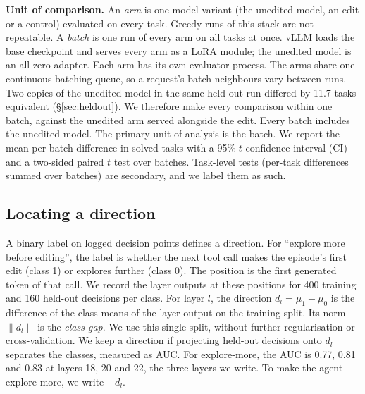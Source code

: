 \textbf{Unit of comparison.} An \emph{arm} is one model variant (the unedited model, an edit or a control) evaluated on every task. Greedy runs of this stack are not repeatable. A \emph{batch} is one run of every arm on all tasks at once. vLLM loads the base checkpoint and serves every arm as a LoRA module; the unedited model is an all-zero adapter. Each arm has its own evaluator process. The arms share one continuous-batching queue, so a request's batch neighbours vary between runs. Two copies of the unedited model in the same held-out run differed by 11.7 tasks-equivalent (\S\ref{sec:heldout}). We therefore make every comparison within one batch, against the unedited arm served alongside the edit. Every batch includes the unedited model. The primary unit of analysis is the batch. We report the mean per-batch difference in solved tasks with a 95\% $t$ confidence interval (CI) and a two-sided paired $t$ test over batches. Task-level tests (per-task differences summed over batches) are secondary, and we label them as such.

\subsection{Locating a direction}
\label{sec:locate}
A binary label on logged decision points defines a direction. For ``explore more before editing'', the label is whether the next tool call makes the episode's first edit (class 1) or explores further (class 0). The position is the first generated token of that call. We record the layer outputs at these positions for 400 training and 160 held-out decisions per class. For layer $l$, the direction $d_l = \mu_1 - \mu_0$ is the difference of the class means of the layer output on the training split. Its norm $\lVert d_l \rVert$ is the \emph{class gap}. We use this single split, without further regularisation or cross-validation. We keep a direction if projecting held-out decisions onto $d_l$ separates the classes, measured as AUC. For explore-more, the AUC is 0.77, 0.81 and 0.83 at layers 18, 20 and 22, the three layers we write. To make the agent explore more, we write $-d_l$.

